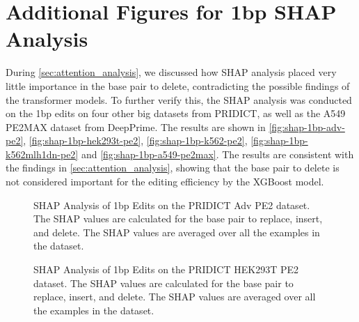 \newpage

\section{Additional Figures for 1bp SHAP Analysis}
\label{appendix:shap-1bp-pridict}

During \autoref{sec:attention_analysis}, we discussed how SHAP analysis placed very little importance in the base pair to delete, contradicting the possible findings of the transformer models. To further verify this, the SHAP analysis was conducted on the 1bp edits on four other big datasets from PRIDICT, as well as the A549 PE2MAX dataset from DeepPrime. The results are shown in \autoref{fig:shap-1bp-adv-pe2}, \autoref{fig:shap-1bp-hek293t-pe2}, \autoref{fig:shap-1bp-k562-pe2}, \autoref{fig:shap-1bp-k562mlh1dn-pe2} and \autoref{fig:shap-1bp-a549-pe2max}. The results are consistent with the findings in \autoref{sec:attention_analysis}, showing that the base pair to delete is not considered important for the editing efficiency by the XGBoost model.

\begin{figure}[!htb]
    \centering
    \caption[SHAP Analysis of 1bp Edits on PRIDICT Adv PE2 Dataset]{SHAP Analysis of 1bp Edits on the PRIDICT Adv PE2 dataset. The SHAP values are calculated for the base pair to replace, insert, and delete. The SHAP values are averaged over all the examples in the dataset.}
    \label{fig:shap-1bp-adv-pe2}
\end{figure}

\begin{figure}[!htb]
    \centering
    \caption[SHAP Analysis of 1bp Edits on PRIDICT HEK293T PE2 Dataset]{SHAP Analysis of 1bp Edits on the PRIDICT HEK293T PE2 dataset. The SHAP values are calculated for the base pair to replace, insert, and delete. The SHAP values are averaged over all the examples in the dataset.}
    \label{fig:shap-1bp-hek293t-pe2}
\end{figure}

